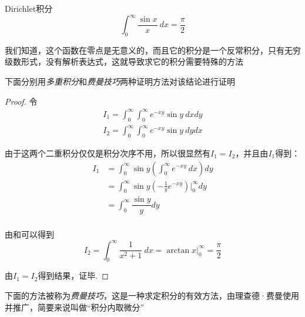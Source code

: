        \begin{lemma}{Dirichlet积分}
            \begin{equation}
                \int_{0}^{\infty}\dfrac{\sin x}{x}\ dx=\dfrac{\pi}{2}
                \label{eq: 2.16}
            \end{equation}
        \end{lemma}

        我们知道，这个函数在零点是无意义的，而且它的积分是一个反常积分，只有无穷级数形式，没有解析表达式，这就导致求它的积分需要特殊的方法

        下面分别用\emph{多重积分}和\emph{费曼技巧}两种证明方法对该结论进行证明

        \begin{proof}
            令
            \begin{equation*}
                \begin{split}
                    I_1=\int_{0}^{\infty}\int_{0}^{\infty}e^{-xy}\sin y\ dxdy\\
                    I_2=\int_{0}^{\infty}\int_{0}^{\infty}e^{-xy}\sin y\ dydx
                \end{split}
            \end{equation*}

            由于这两个二重积分仅仅是积分次序不用，所以很显然有$I_1=I_2$，并且由$I_1$得到：
            \begin{equation*}
                \begin{split}
                    I_1&=\int_{0}^{\infty}\sin y(\int_{0}^{\infty}e^{-xy}\ dx)dy\\
                    &=\int_{0}^{\infty}\sin y(-\frac{1}{y}e^{-xy})\big|_0^\infty dy\\
                    &=\int_{0}^{\infty}\dfrac{\sin y}{y} dy\\
                \end{split}
            \end{equation*}

            由和可以得到
            \begin{equation*}
                I_2=\int_{0}^{\infty}\dfrac{1}{x^2+1}\ dx=\arctan x\bigg|_{0}^{\infty}=\dfrac{\pi}{2}\tag*{}
            \end{equation*}

            由$I_1=I_2$得到结果，证毕.
        \end{proof}

        下面的方法被称为\emph{费曼技巧}，这是一种求定积分的有效方法，由理查德·费曼使用并推广，简要来说叫做“积分内取微分”

